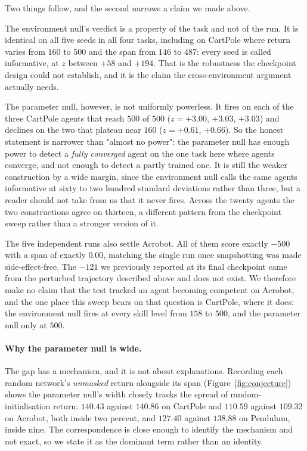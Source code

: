 \documentclass[10pt,twocolumn]{article}
\begin{document}
Two things follow, and the second narrows a claim we made above.

The environment null's verdict is a property of the task and not of the run. It
is identical on all five seeds in all four tasks, including on CartPole where
return varies from $160$ to $500$ and the span from $146$ to $487$: every seed
is called informative, at $z$ between $+58$ and $+194$. That is the robustness
the checkpoint design could not establish, and it is the claim the
cross-environment argument actually needs.

The parameter null, however, is not uniformly powerless. It fires on each of the
three CartPole agents that reach $500$ of $500$ ($z=+3.00$, $+3.03$, $+3.03$)
and declines on the two that plateau near $160$ ($z=+0.61$, $+0.66$). So the
honest statement is narrower than "almost no power": the parameter null has
enough power to detect a \emph{fully converged} agent on the one task here where
agents converge, and not enough to detect a partly trained one. It is still the
weaker construction by a wide margin, since the environment null calls the same
agents informative at sixty to two hundred standard deviations rather than
three, but a reader should not take from us that it never fires. Across the
twenty agents the two constructions agree on thirteen, a different pattern from
the checkpoint sweep rather than a stronger version of it.

The five independent runs also settle Acrobot. All of them score exactly $-500$
with a span of exactly $0.00$, matching the single run once snapshotting was made
side-effect-free. The $-121$ we previously reported at its final checkpoint came
from the perturbed trajectory described above and does not exist. We therefore
make no claim that the test tracked an agent becoming competent on Acrobot, and
the one place this sweep bears on that question is CartPole, where it does: the
environment null fires at every skill level from $158$ to $500$, and the
parameter null only at $500$.

\paragraph{Why the parameter null is wide.}
\label{par:why}
The gap has a mechanism, and it is not about explanations. Recording each random
network's \emph{unmasked} return alongside its span
(Figure~\ref{fig:conjecture}) shows the parameter null's width closely tracks
the spread of random-initialisation return: $140.43$ against $140.86$ on
CartPole and $110.59$ against $109.32$ on Acrobot, both inside two percent, and
$127.40$ against $138.88$ on Pendulum, inside nine. The correspondence is close
enough to identify the mechanism and not exact, so we state it as the dominant
term rather than an identity.
\end{document}
